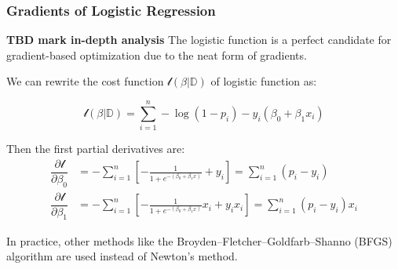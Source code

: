\documentclass[10pt,aspectratio=169]{beamer}
\begin{document}
      \begin{frame}
        \frametitle{Gradients of Logistic Regression}
        \textbf{TBD mark in-depth analysis} The logistic function is a
        perfect candidate for gradient-based optimization due to the
        neat form of gradients.

        \vfill We can rewrite the cost function
        $\mathscr{l}(\beta|\mathbb{D})$ of logistic function as:

        \begin{equation*}
          \mathscr{l}(\beta|\mathbb{D}) = \sum_{i=1}^{n}  -\log (1 - p_{i}) - y_{i} (\beta_{0} + \beta_{1}x_{i})
        \end{equation*}

        Then the first partial derivatives are:
        \begin{align*}
          \dfrac{\partial \mathscr{l}}{\partial \beta_{0}}
          &= -\sum_{i=1}^{n} \left[ -\frac{1}{1 + e^{-(\beta_{0} + \beta_{1} x)}} + y_{i} \right] = \sum_{i=1}^{n} (p_{i} - y_{i})\\
          \dfrac{\partial \mathscr{l}}{\partial \beta_{1}}
          &= -\sum_{i=1}^{n} \left[ -\frac{1}{1 + e^{-(\beta_{0} + \beta_{1} x)}}x_{i} + y_{i}x_{i} \right]= \sum_{i=1}^{n} (p_{i} - y_{i})x_{i}
        \end{align*}
        
        \vfill In practice, other methods like the
        Broyden–Fletcher–Goldfarb–Shanno (BFGS) algorithm are used
        instead of Newton's method.

        
      \end{frame}
\end{document}
